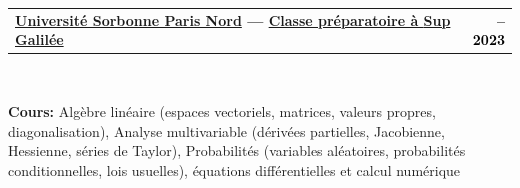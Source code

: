 \documentclass[10pt,english,french]{article}
\makeatletter
\newlength{\mpwidth}
\newcommand{\cvtextnotab}[1]{
    \parbox{1\mpwidth}{#1}
}
\newcommand{\cvevent}[2]{
    \vspace{2pt}
    \parbox{\mpwidth}{
        \begin{tabular*}{1\mpwidth}{@{\extracolsep{\fill}} l r}
            \textcolor{black}{\textbf{\fontsize{11}{12}\selectfont #1}} & \textcolor{black}{\textbf{\fontsize{12}{12}\selectfont #2}} \\
        \end{tabular*}\\[-8pt] %
    }
}
\newcommand{\cvsubevent}[2]{
    \parbox{\mpwidth}{
        \begin{tabular*}{1\mpwidth}{@{\extracolsep{\fill}} l r}
            \textcolor{black}{\textit{\fontsize{10}{12}\selectfont #1}} & \textcolor{black}{\textit{\fontsize{10}{12}\selectfont #2}} \\
        \end{tabular*}\\[-8pt] %
    }
    \vspace{-10pt}
}
\makeatother
\begin{document}



\vspace{-10pt}
\noindent{\textcolor{middle_light_gray}{\rule{\mpwidth}{0.2pt}}}
\vspace{-15pt}

\cvevent{\href{https://www.univ-spn.fr}{Université Sorbonne Paris Nord} --- \href{https://www.sup-galilee.univ-paris13.fr/index.php/formation/cp2i/}{Classe préparatoire à \textbf{Sup Galilée}}}{\fontsize{11pt}{11pt}\selectfont 2021\hspace{5pt}--\hspace{5pt}2023}

\vspace{-10pt}
\cvtextnotab{
    \textbf{Cours\!:}
    Algèbre linéaire (espaces vectoriels, matrices, valeurs propres, diagonalisation),
    Analyse multivariable (dérivées partielles, Jacobienne, Hessienne, séries de Taylor),
    Probabilités (variables aléatoires, probabilités conditionnelles, lois usuelles),
    équations différentielles et calcul numérique
}


\end{document}
